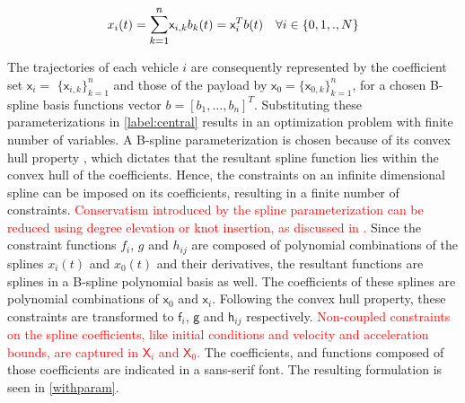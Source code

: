 \documentclass[letterpaper, 10 pt, conference]{ieeeconf}
\newcommand{\cx}{\textsf{x}}
\newcommand{\cf}{\textsf{f}}
\newcommand{\cg}{\textsf{g}}
\newcommand{\ch}{\textsf{h}}
\newcommand{\X}{\textsf{X}}
\begin{document}
\begin{equation}\label{spline}
x_i(t) = \mathlarger{\sum\limits_{k=1}^{n}} \cx_{i,k}b_k(t) = \cx_i^Tb(t) \quad \forall i \in \{0,1,.,N\}
\end{equation}

 The trajectories of each vehicle $i$ are consequently represented by the coefficient set $\cx_i$$=$ $\{\cx_{i,k}\}_{k=1}^{n}$ and those of the payload by $\cx_0$$=$$\{\cx_{0,k}\}_{k=1}^{n}$, for a chosen B-spline basis functions vector $b = [b_1,\ldots,b_n]^T$. Substituting these parameterizations in \eqref{label:central} results in an optimization problem with finite number of variables. A B-spline parameterization is chosen because of its convex hull property \cite{c15}, which dictates that the resultant spline function lies within the convex hull of the coefficients. Hence, the constraints on an infinite dimensional spline can be imposed on its coefficients, resulting in a finite number of constraints. \textcolor{red}{Conservatism introduced by the spline parameterization can be reduced using degree elevation or knot insertion, as discussed in \cite{c15}.} Since the constraint functions $f_i$, $g$ and $h_{ij}$ are composed of polynomial combinations of the splines $x_i(t)$ and $x_0(t)$ and their derivatives, the resultant functions are splines in a B-spline polynomial basis as well. The coefficients of these splines are polynomial combinations of $\cx_0$ and $\cx_i$. Following the convex hull property, these constraints are transformed to $\cf_i$, $\cg$ and $\ch_{ij}$ respectively. \textcolor{red}{Non-coupled constraints on the spline coefficients, like initial conditions and velocity and acceleration bounds, are captured in $\X_i$ and $\X_0$.} The coefficients, and functions composed of those coefficients are indicated in a sans-serif font.
The resulting formulation is seen in \eqref{withparam}.
\end{document}
